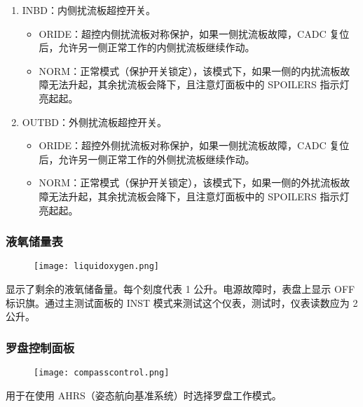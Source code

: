 \begin{enumerate}
  \item INBD：内侧扰流板超控开关。
  \begin{itemize}
    \item ORIDE：超控内侧扰流板对称保护，如果一侧扰流板故障，CADC 复位后，允许另一侧正常工作的内侧扰流板继续作动。
    \item NORM：正常模式（保护开关锁定），该模式下，如果一侧的内扰流板故障无法升起，其余扰流板会降下，且注意灯面板中的 SPOILERS 指示灯亮起起。
  \end{itemize}
  \item OUTBD：外侧扰流板超控开关。
  \begin{itemize}
    \item ORIDE：超控外侧扰流板对称保护，如果一侧扰流板故障，CADC 复位后，允许另一侧正常工作的外侧扰流板继续作动。
    \item NORM：正常模式（保护开关锁定），该模式下，如果一侧的外扰流板故障无法升起，其余扰流板会降下，且注意灯面板中的 SPOILERS 指示灯亮起起。
  \end{itemize}
\end{enumerate}

\subsubsection{液氧储量表}

\begin{figure}[htb]
  \center
  \texttt{[image: liquidoxygen.png]}
\end{figure}
显示了剩余的液氧储备量。每个刻度代表 1 公升。电源故障时，表盘上显示 OFF 标识旗。通过主测试面板的 INST 模式来测试这个仪表，测试时，仪表读数应为 2 公升。

\subsubsection{罗盘控制面板}

\begin{figure}[htb]
  \center
  \texttt{[image: compasscontrol.png]}
\end{figure}
用于在使用 AHRS（姿态航向基准系统）时选择罗盘工作模式。

